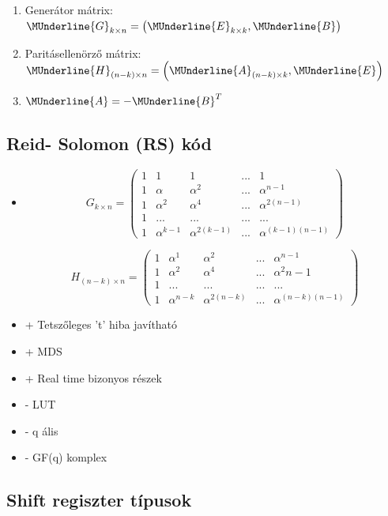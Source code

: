 	\begin{enumerate}
		\item Generátor mátrix: $\MUnderline{G}_{k \times n} = \left( \MUnderline{E}_{k \times k} , \MUnderline{B} \right)$
		\item Paritásellenörző mátrix: $\MUnderline{H}_{(n-k)\times n} = \left( \MUnderline{A}_{(n-k)\times k} , \MUnderline{E}   \right)$
		\item $\MUnderline{A} = - \MUnderline{B}^T$

	\end{enumerate}

\subsection{Reid- Solomon (RS) kód}

	\begin{itemize}
		\item
\[
G_{k\times n}=
  \begin{pmatrix}
    1 & 1 & 1 & ... & 1 \\
    1 & \alpha & \alpha^2 & ... & \alpha^{n-1} \\
    1 & \alpha^2 & \alpha^4 & ... & \alpha^{2(n-1)} \\
    1 & ... & ... & ... & ...\\
    1 & \alpha^{k-1} & \alpha^{2(k-1)} & ... & \alpha^{(k-1)(n-1)}
  \end{pmatrix}
\]

\[
H_{(n-k)\times n}=
  \begin{pmatrix}
    1 & \alpha^1 & \alpha^2 & ... & \alpha^{n-1} \\
    1 & \alpha^2 & \alpha^4 & ... & \alpha^2{n-1} \\
    1 & ... & ... & ... & ...\\
    1 & \alpha^{n-k} & \alpha^{2(n-k)} & ... & \alpha^{(n-k)(n-1)}
  \end{pmatrix}
\]


	\item + Tetszőleges 't' hiba javítható
	\item + MDS
	\item + Real time bizonyos részek
	\item - LUT
	\item - q ális
	\item - GF(q) komplex

	\end{itemize}


\subsection{Shift regiszter típusok}

